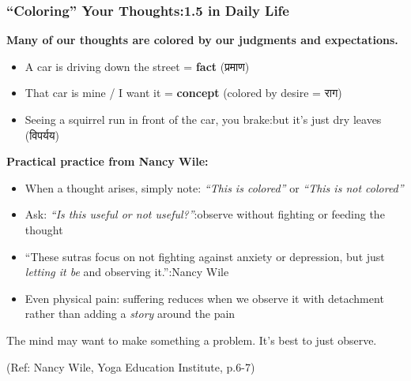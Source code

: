 \begin{frame}[fragile]\frametitle{``Coloring'' Your Thoughts:1.5 in Daily Life}

\begin{center}
{\normalsize \textbf{Many of our thoughts are colored by our judgments and expectations.}}
\end{center}

\begin{itemize}
\item A car is driving down the street = \textbf{fact} (प्रमाण)
\item That car is mine / I want it = \textbf{concept} (colored by desire = राग)
\item Seeing a squirrel run in front of the car, you brake:but it's just dry leaves (विपर्यय)
\end{itemize}

\textbf{Practical practice from Nancy Wile:}
\begin{itemize}
\item When a thought arises, simply note: \emph{``This is colored''} or \emph{``This is not colored''}
\item Ask: \emph{``Is this useful or not useful?''}:observe without fighting or feeding the thought
\item ``These sutras focus on not fighting against anxiety or depression, but just \emph{letting it be} and observing it.'':Nancy Wile
\item Even physical pain: suffering reduces when we observe it with detachment rather than adding a \emph{story} around the pain
\end{itemize}

\begin{center}
{\small The mind may want to make something a problem. It's best to just observe.}
\end{center}

\tiny{(Ref: Nancy Wile, Yoga Education Institute, p.6-7)}

\end{frame}

